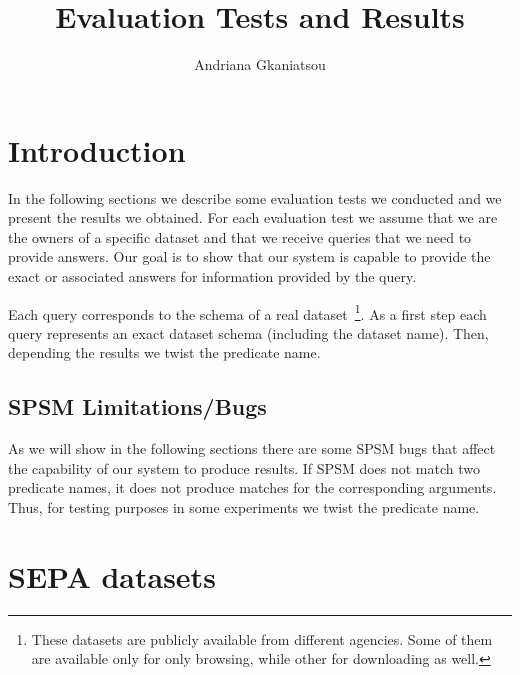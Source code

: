 \documentclass[a4paper,10pt]{article}
\title{Evaluation Tests and Results}
\author{Andriana Gkaniatsou}
\begin{document}
\maketitle

\section{Introduction}
In the following sections we describe some evaluation tests we conducted and we present the 
results we obtained. For each evaluation test we assume that we are the owners of a specific dataset 
and that we receive queries that we need to provide answers. 
Our goal is to show that our system is capable to provide the exact or associated answers for information provided by the 
 query.   

Each query corresponds to the schema of a real dataset~\footnote{These datasets are publicly available from different agencies. Some of them are available only for only browsing, while other for downloading as well.}. As a first step 
each query represents an exact dataset schema  (including the dataset name). Then, depending the results we twist the 
predicate name. 

\subsection{SPSM Limitations/Bugs}

As we will show in the following sections there are some SPSM bugs that affect the capability of our system to produce results. If SPSM does not match two predicate names, it does not produce matches for the corresponding arguments. Thus, for testing purposes in some experiments we twist the predicate name. 



\section{SEPA datasets}
\end{document}
